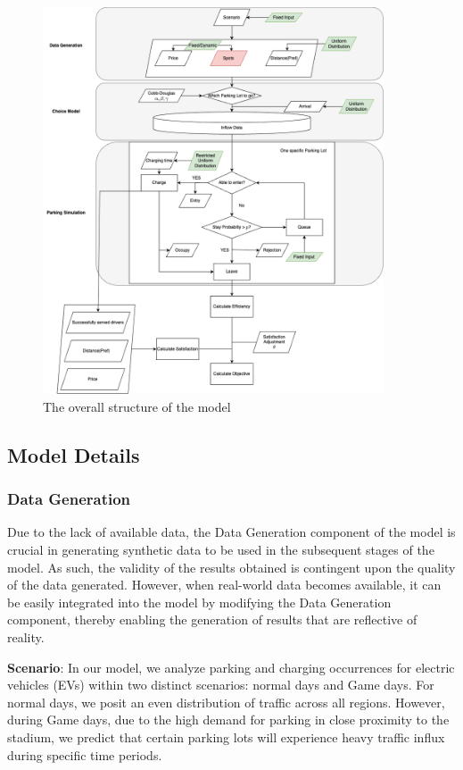 \begin{figure}[t]
    \includegraphics[width = 0.9\textwidth] {figure/flowchart.png}
    \centering
    \caption{The overall structure of the model}
    \label{fig:flowchart}
\end{figure}


\subsection{Model Details}
\subsubsection{Data Generation}
Due to the lack of available data, the Data Generation component of the model is crucial in generating synthetic data to be used in the subsequent stages of the model. As such, the validity of the results obtained is contingent upon the quality of the data generated. However, when real-world data becomes available, it can be easily integrated into the model by modifying the Data Generation component, thereby enabling the generation of results that are reflective of reality.

\textbf{Scenario}: In our model, we analyze parking and charging occurrences for electric vehicles (EVs) within two distinct scenarios: normal days and Game days. For normal days, we posit an even distribution of traffic across all regions. However, during Game days, due to the high demand for parking in close proximity to the stadium, we predict that certain parking lots will experience heavy traffic influx during specific time periods.

